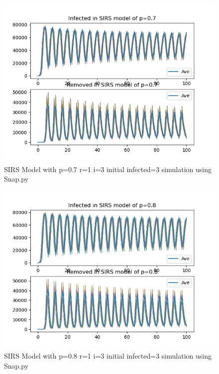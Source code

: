 \documentclass{subfile}
\begin{document}
  \begin{figure}
  \includegraphics[scale=0.8]{sirsp07r1i3s3}
  \caption[SIRS p=0.7,r=1,i=3,init infected=3]{SIRS Model with p=0.7 r=1 i=3 initial infected=3 simulation using Snap.py}
  \end{figure}
  \begin{figure}
  \includegraphics[scale=0.8]{sirsp08r1i3s3}
  \caption[SIRS p=0.8,r=1,i=3,init infected=3]{SIRS Model with p=0.8 r=1 i=3 initial infected=3 simulation using Snap.py}
  \end{figure}
\end{document}
